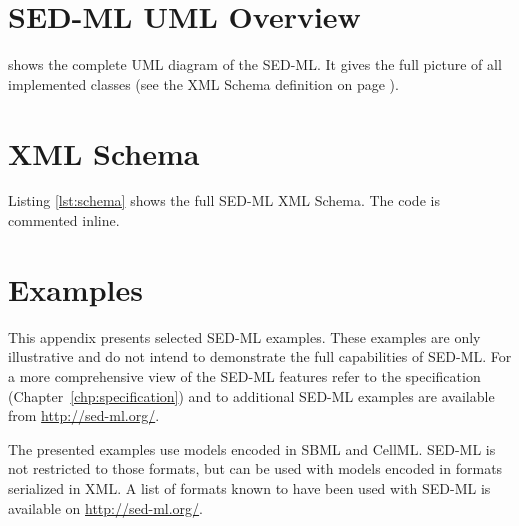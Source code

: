 \documentclass[pdftex,rgb,dvipsnames,svgnames,hyperref,table]{report}
\begin{document}
\appendix
\chapter{SED-ML UML Overview}
 shows the complete UML diagram of the SED-ML. It gives the full picture of all implemented classes (see the XML Schema definition on page \pageref{lst:schema}).
\label{app:uml}

\chapter{XML Schema}
Listing \ref{lst:schema} shows the full SED-ML XML Schema. The code is commented inline.
\label{sec:xmlschema}

\chapter{Examples}
This appendix presents selected SED-ML examples. These examples are only illustrative and do not intend to demonstrate the full capabilities of SED-ML. For a more comprehensive view of the SED-ML features refer to the specification (Chapter~\ref{chp:specification}) and to additional SED-ML examples are available from \url{http://sed-ml.org/}.

The presented examples use models encoded in SBML and CellML. SED-ML is not restricted to those formats, but can be used with models encoded in formats serialized in XML. A list of formats known to have been used with SED-ML is available on \url{http://sed-ml.org/}.









\end{document}
